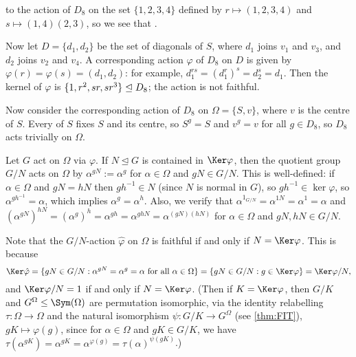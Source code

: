 \begin{example}
     to the action of $D_8$ on the set $\{1,2,3,4\}$ defined by $r \mapsto (1,2,3,4)$ and $s \mapsto (1,4)(2,3)$, so we see that .

    Now let $D = \{d_1,d_2\}$ be the set of diagonals of $S$, where $d_1$ joins $v_1$ and $v_3$, and $d_2$ joins $v_2$ and $v_4$. A corresponding action $\varphi$ of $D_8$ on $D$ is given by $\varphi(r) = \varphi(s) = (d_1,d_2)$: for example, $d_1^{rs} = (d_1^r)^s = d_2^s = d_1$. Then the kernel of $\varphi$ is $\{1,r^2,\added{2}{sr,sr^3}\} \trianglelefteq D_8$; the action is not faithful.

    Now consider the corresponding action of $D_8$ on $\Omega = \{S,v\}$, where $v$ is the centre of $S$. Every  of $S$ fixes $S$ and its centre, so $S^g = S$ and $v^g = v$ for all $g \in D_8$, so $D_8$ acts trivially on $\Omega$.
\end{example}

\begin{example}\label{eg:quotient_action}
    Let $G$ act on $\Omega$ via $\varphi$. If $N \unlhd G$ is contained in $\Ker\varphi$, then the quotient group $G/N$ acts on $\Omega$ by $\alpha^{gN} := \alpha^g$ for $\alpha \in \Omega$ and $gN \in G/N$. This is well-defined: if $\alpha \in \Omega$ and $gN = hN$ then $gh^{-1} \in N$ (since $N$ is normal in $G$), so $gh^{-1} \in \ker\varphi$, so $\alpha^{gh^{-1}} = \alpha$, which implies $\alpha^g = \alpha^h$. Also, we verify that $\alpha^{1_{G/N}} = \alpha^{1N} = \alpha^1 = \alpha$ and $(\alpha^{gN})^{hN} = (\alpha^g)^h = \alpha^{gh} = \alpha^{ghN} = \alpha^{(gN)(hN)}$ for $\alpha \in \Omega$ and $gN,hN \in G/N$.

    Note that the $G/N$-action $\hat\varphi$ on $\Omega$ is faithful if and only if $N = \Ker\varphi$. This is because
    $$\Ker\hat\varphi = \{gN \in G/N : \alpha^{gN} = \alpha^g = \alpha\ \text{for all}\ \alpha \in \Omega\} = \{gN \in G/N : g \in \Ker\varphi\} = \Ker\varphi/N,$$
    and $\Ker\varphi/N = 1$ if and only if $N = \Ker\varphi$. (Then if $K = \Ker\varphi$, then $G/K$ and $G^\Omega \leq \Sym(\Omega)$ are permutation isomorphic, via the identity relabelling $\tau : \Omega \to \Omega$ and the natural isomorphism $\psi : G/K \to G^\Omega$ (see \autoref{thm:FIT}), $gK \mapsto \varphi(g)$, since for $\alpha \in \Omega$ and $gK \in G/K$, we have $\tau(\alpha^{gK}) = \alpha^{gK} = \alpha^{\varphi(g)} = \tau(\alpha)^{\psi(gK)}$.)
\end{example}

